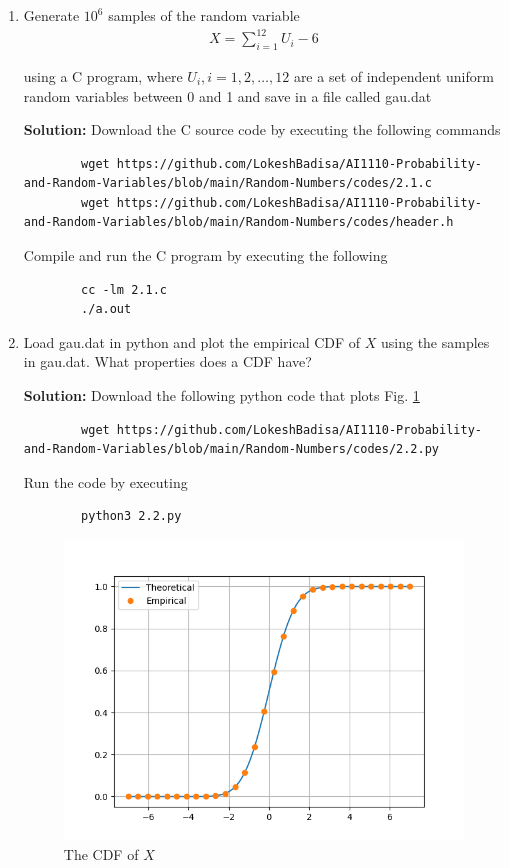 \documentclass[journal,12pt,twocolumn]{IEEEtran}
\newcommand{\solution}{\noindent \textbf{Solution: }}
\numberwithin{equation}{section}
\renewcommand\thesection{\arabic{section}}
\begin{document}
	\begin{enumerate}[label=\thesection.\arabic*,ref=\thesection.\theenumi]
	\item Generate $10^6$ samples of the random variable
	\begin{align}
		X = \sum_{i=1}^{12}U_i -6
	\end{align}

	using a C program, where $U_i, i = 1,2,\dots, 12$ are  a set of independent uniform random variables between 0 and 1 and save in a file called gau.dat
	
	\solution Download the C source code by executing the following commands
	\begin{lstlisting}
		wget https://github.com/LokeshBadisa/AI1110-Probability-and-Random-Variables/blob/main/Random-Numbers/codes/2.1.c
		wget https://github.com/LokeshBadisa/AI1110-Probability-and-Random-Variables/blob/main/Random-Numbers/codes/header.h
	\end{lstlisting}
	Compile and run the C program by executing the following
	\begin{lstlisting}
		cc -lm 2.1.c
		./a.out
	\end{lstlisting}
		
	\item Load gau.dat in python and plot the empirical CDF of $X$ using the samples in gau.dat. What properties does a CDF have?

	\solution Download the following python code that plots Fig. \ref{fig-2.2}
	\begin{lstlisting}
		wget https://github.com/LokeshBadisa/AI1110-Probability-and-Random-Variables/blob/main/Random-Numbers/codes/2.2.py
	\end{lstlisting}
	Run the code by executing
	\begin{lstlisting}
		python3 2.2.py
	\end{lstlisting}
	\begin{figure}
		\centering
		\includegraphics[width=\columnwidth]{./figs/2.2.png}
		\caption{The CDF of $X$}
		\label{fig-2.2}
	\end{figure}
	

\end{enumerate}
\end{document}
